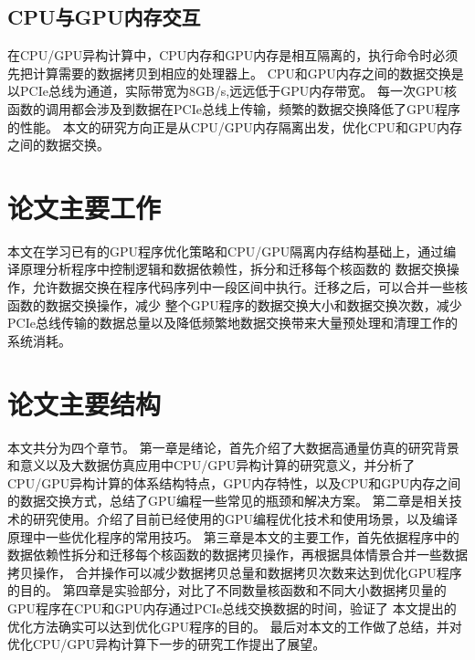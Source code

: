 \subsection{CPU与GPU内存交互}
在CPU/GPU异构计算中，CPU内存和GPU内存是相互隔离的，执行命令时必须先把计算需要的数据拷贝到相应的处理器上。
CPU和GPU内存之间的数据交换是以PCIe总线为通道，实际带宽为8GB/s,远远低于GPU内存带宽。
每一次GPU核函数的调用都会涉及到数据在PCIe总线上传输，频繁的数据交换降低了GPU程序的性能。
本文的研究方向正是从CPU/GPU内存隔离出发，优化CPU和GPU内存之间的数据交换。

\section{论文主要工作}
本文在学习已有的GPU程序优化策略和CPU/GPU隔离内存结构基础上，通过编译原理分析程序中控制逻辑和数据依赖性，拆分和迁移每个核函数的
数据交换操作，允许数据交换在程序代码序列中一段区间中执行。迁移之后，可以合并一些核函数的数据交换操作，减少
整个GPU程序的数据交换大小和数据交换次数，减少PCIe总线传输的数据总量以及降低频繁地数据交换带来大量预处理和清理工作的系统消耗。

\section{论文主要结构}
本文共分为四个章节。
第一章是绪论，首先介绍了大数据高通量仿真的研究背景和意义以及大数据仿真应用中CPU/GPU异构计算的研究意义，并分析了
CPU/GPU异构计算的体系结构特点，GPU内存特性，以及CPU和GPU内存之间的数据交换方式，总结了GPU编程一些常见的瓶颈和解决方案。
第二章是相关技术的研究使用。介绍了目前已经使用的GPU编程优化技术和使用场景，以及编译原理中一些优化程序的常用技巧。
第三章是本文的主要工作，首先依据程序中的数据依赖性拆分和迁移每个核函数的数据拷贝操作，再根据具体情景合并一些数据拷贝操作，
合并操作可以减少数据拷贝总量和数据拷贝次数来达到优化GPU程序的目的。
第四章是实验部分，对比了不同数量核函数和不同大小数据拷贝量的GPU程序在CPU和GPU内存通过PCIe总线交换数据的时间，验证了
本文提出的优化方法确实可以达到优化GPU程序的目的。
最后对本文的工作做了总结，并对优化CPU/GPU异构计算下一步的研究工作提出了展望。






